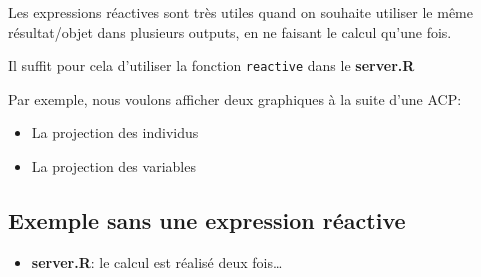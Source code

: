 \documentclass[]{article}
\newenvironment{Shaded}{\begin{snugshade}}{\end{snugshade}}
\newcommand{\KeywordTok}[1]{\textcolor[rgb]{0.13,0.29,0.53}{\textbf{#1}}}
\newcommand{\DataTypeTok}[1]{\textcolor[rgb]{0.13,0.29,0.53}{#1}}
\newcommand{\DecValTok}[1]{\textcolor[rgb]{0.00,0.00,0.81}{#1}}
\newcommand{\StringTok}[1]{\textcolor[rgb]{0.31,0.60,0.02}{#1}}
\newcommand{\OtherTok}[1]{\textcolor[rgb]{0.56,0.35,0.01}{#1}}
\newcommand{\OperatorTok}[1]{\textcolor[rgb]{0.81,0.36,0.00}{\textbf{#1}}}
\newcommand{\NormalTok}[1]{#1}
\providecommand{\tightlist}{%
  \setlength{\itemsep}{0pt}\setlength{\parskip}{0pt}}
\begin{document}
Les expressions réactives sont très utiles quand on souhaite utiliser le
même résultat/objet dans plusieurs outputs, en ne faisant le calcul
qu'une fois.

Il suffit pour cela d'utiliser la fonction \texttt{reactive} dans le
\textbf{server.R}

Par exemple, nous voulons afficher deux graphiques à la suite d'une ACP:

\begin{itemize}
\tightlist
\item
  La projection des individus
\item
  La projection des variables
\end{itemize}

\subsection{Exemple sans une expression
réactive}\label{exemple-sans-une-expression-reactive}

\begin{itemize}
\tightlist
\item
  \textbf{server.R}: le calcul est réalisé deux fois\ldots{}
\end{itemize}

\begin{Shaded}
\end{Shaded}
\end{document}
